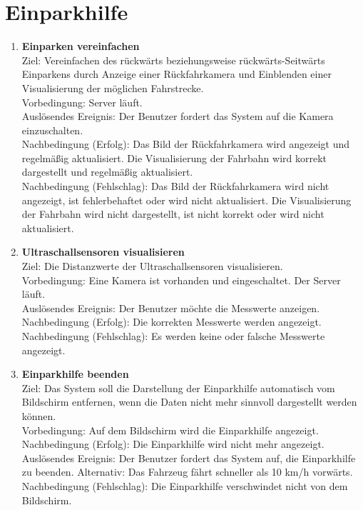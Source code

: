 \documentclass[pflichtenheft.tex]{subfiles}
\begin{document}
	\section{Einparkhilfe}
	
	\begin{enumerate}
	\setcounter{enumi}{\value{enumTemp}}

	\item{\textbf{Einparken vereinfachen}} \\ Ziel: Vereinfachen des rückwärts beziehungsweise rückwärts-Seitwärts Einparkens durch Anzeige einer Rückfahrkamera und Einblenden einer Visualisierung der möglichen Fahrstrecke. \\ Vorbedingung: Server läuft. \\ Auslösendes Ereignis:  Der Benutzer fordert das System auf die Kamera einzuschalten. \\ Nachbedingung (Erfolg): Das Bild der Rückfahrkamera wird angezeigt und regelmäßig aktualisiert. Die Visualisierung der Fahrbahn wird korrekt dargestellt und regelmäßig aktualisiert. \\ Nachbedingung (Fehlschlag): Das Bild der Rückfahrkamera wird nicht angezeigt, ist fehlerbehaftet oder wird nicht aktualisiert. Die Visualisierung der Fahrbahn wird nicht dargestellt, ist nicht korrekt oder wird nicht aktualisiert. 

	\item{\textbf{Ultraschallsensoren visualisieren}} \label{ultrasound} \\ Ziel: Die Distanzwerte der Ultraschallsensoren visualisieren. \\ Vorbedingung: Eine Kamera ist vorhanden und eingeschaltet. Der Server läuft. \\ Auslösendes Ereignis:  Der Benutzer möchte die Messwerte anzeigen.\\ Nachbedingung (Erfolg): Die korrekten Messwerte werden angezeigt. \\ Nachbedingung (Fehlschlag): Es werden keine oder falsche Messwerte angezeigt.

	\item{\textbf{Einparkhilfe beenden}} \\ Ziel: Das System soll die Darstellung der Einparkhilfe automatisch vom Bildschirm entfernen, wenn die Daten nicht mehr sinnvoll dargestellt werden können. \\ Vorbedingung: Auf dem Bildschirm wird die Einparkhilfe angezeigt. \\ Nachbedingung (Erfolg): Die Einparkhilfe wird nicht mehr angezeigt. \\ Auslösendes Ereignis: Der Benutzer fordert das System auf, die Einparkhilfe zu beenden. Alternativ: Das Fahrzeug fährt schneller als 10 km/h vorwärts. \\  Nachbedingung (Fehlschlag): Die Einparkhilfe verschwindet nicht von dem Bildschirm.

	\setcounter{enumTemp}{\value{enumi}}

	\end{enumerate}
	
\end{document}
